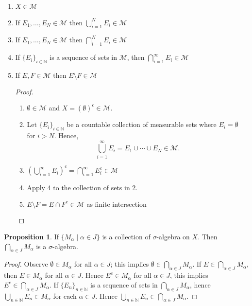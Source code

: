 \documentclass[11pt]{article}
\theoremstyle{definition}
\newtheorem{proposition}{Proposition}[section]
\theoremstyle{remark}
\begin{document}
\begin{enumerate}
    \item $X \in \mathcal{M}$

    \item If $E_1, \ldots, E_N \in \mathcal{M}$ then $\bigcup_{i=1}^N E_i \in \mathcal{M}$

    \item If $E_1, \ldots, E_N \in \mathcal{M}$ then $\bigcap_{i=1}^N E_i \in \mathcal{M}$

    \item If $\{E_i\}_{i \in \mathbb{N}}$ is a sequence of sets in $\mathcal{M}$, then $\bigcap_{i=1}^\infty E_i \in \mathcal{M}$

    \item If $E, F \in \mathcal{M}$ then $E \setminus F \in \mathcal{M}$

    \begin{proof}
    \begin{enumerate}
        \item $\emptyset \in \mathcal{M}$ and $X = (\emptyset)^c \in \mathcal{M}$.

        \item Let $\{E_i\}_{i \in \mathbb{N}}$ be a countable collection of measurable sets where $E_i = \emptyset$ for $i > N$. Hence,
        \[
        \bigcup_{i=1}^\infty E_i = E_1 \cup \cdots \cup E_N \in \mathcal{M}.
        \]

        \item $(\bigcup_{i=1}^\infty E_i)^c = \bigcap_{i=1}^\infty E_i^c \in \mathcal{M}$

        \item Apply 4 to the collection of sets in 2.

        \item $E \setminus F = E \cap F^c \in \mathcal{M}$ as finite intersection
    \end{enumerate}
    \end{proof}
\end{enumerate}

\begin{proposition}\label{prop:intersection_sigma_algebra}
If $\{M_{\alpha} \mid \alpha \in J\}$ is a collection of $\sigma$-algebra on $X$. Then $\bigcap_{\alpha \in J} M_{\alpha}$ is a $\sigma$-algebra.
\end{proposition}

\begin{proof}
Observe $\emptyset \in M_{\alpha}$ for all $\alpha \in J$; this implies
$\emptyset \in \bigcap_{\alpha \in J} M_{\alpha}$. If $E \in \bigcap_{\alpha \in J} M_{\alpha}$, then $E \in M_{\alpha}$ for all $\alpha \in J$.
Hence $E^c \in M_{\alpha}$ for all $\alpha \in J$, this implies
$E^c \in \bigcap_{\alpha \in J} M_{\alpha}$. If $\{E_n\}_{n \in \mathbb{N}}$ is a sequence of sets in
$\bigcap_{\alpha \in J} M_{\alpha}$, hence $\bigcup_{n \in \mathbb{N}} E_n \in M_{\alpha}$ for each $\alpha \in J$.
Hence $\bigcup_{n \in \mathbb{N}} E_n \in \bigcap_{\alpha \in J} M_{\alpha}$.
\end{proof}
\end{document}
